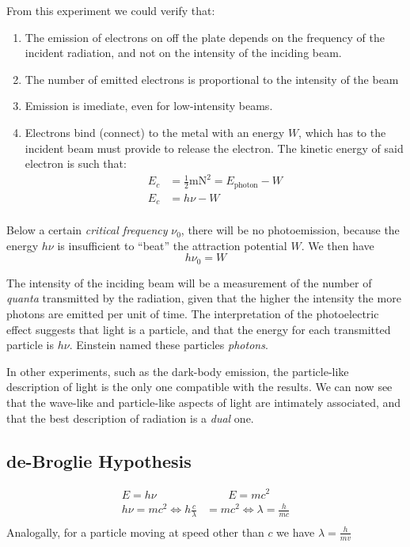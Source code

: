 \documentclass[10pt]{article}
\begin{document}

From this experiment we could verify that:
\begin{enumerate}
	\item The emission of electrons on off the plate depends on the frequency of
	      the incident radiation, and not on the intensity of the inciding beam.
	\item The number of emitted electrons is proportional to the intensity of
	      the beam
	\item Emission is imediate, even for low-intensity beams.
	\item Electrons bind (connect) to the metal with an energy $W$, which has to
	      the incident beam must provide to release the electron. The kinetic
	      energy of said electron is such that:
	      \begin{align*}
	      	E_c & = \frac{1}{2}\si{\metre\newton}^2 = E_{\text{photon}} - W \\
	      	E_c & = h\nu - W                                                \\
	      \end{align*}
\end{enumerate}
Below a certain \emph{critical frequency} $\nu_0$, there will be no
photoemission, because the energy $h\nu$ is insufficient to ``beat''
the attraction potential $W$. We then have
$$h\nu_0 = W$$

The intensity of the inciding beam will be a measurement of the number of
\emph{quanta} transmitted by the radiation, given that the higher the intensity
the more photons are emitted per unit of time. The interpretation of the
photoelectric effect suggests that light is a particle, and that the energy for
each transmitted particle is $h\nu$. Einstein named these particles \emph{photons}.

In other experiments, such as the dark-body emission, the particle-like
description of light is the only one compatible with the results. We can now see
that the wave-like and particle-like aspects of light are intimately associated,
and that the best description of radiation is a \emph{dual} one.

\subsection{de-Broglie Hypothesis}
\begin{align*}
	E=h\nu                            & \qquad E=mc^2                      \\
	h\nu=mc^2 \iff h\frac{c}{\lambda} & = mc^2 \iff \lambda = \frac{h}{mc} \\
\end{align*}
Analogally, for a particle moving at speed other than $c$ we have $\lambda = \frac{h}{mv}$
\end{document}
